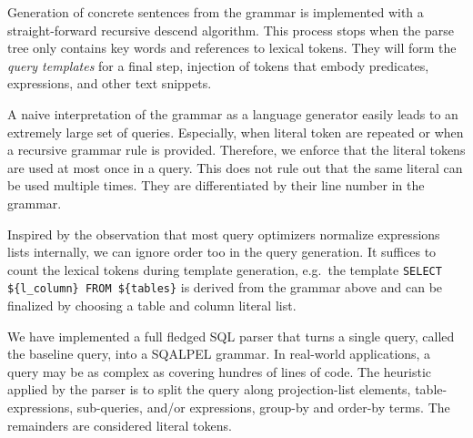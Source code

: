 \documentclass{cidr-2019}
\begin{document}
Generation of concrete sentences from the grammar is implemented with
a straight-forward recursive descend algorithm. This process stops
when the parse tree only contains key words and references to lexical
tokens. They will form the \emph{ query templates} for a final step,
injection of tokens that embody predicates, expressions, and other
text snippets.

A naive interpretation of the grammar as a language generator easily
leads to an extremely large set of queries. Especially, when literal
token are repeated or when a recursive grammar rule is provided.
Therefore, we enforce that the literal tokens are used at most once in
a query. This does not rule out that the same literal can be used
multiple times. They are differentiated by their line number in the
grammar.

Inspired by the observation that most query optimizers normalize
expressions lists internally, we can ignore order too in the query
generation. It suffices to count the lexical tokens during template
generation, e.g.\ the template \verb~SELECT ${l_column} FROM ${tables}~
is derived from the grammar above and can be finalized by choosing a
table and column literal list.




We have implemented a full fledged SQL parser that turns a single
query, called the baseline query, into a {\sc SQALPEL} grammar. In
real-world applications, a query may be as complex as covering hundres
of lines of code. The heuristic applied by the parser is to split the
query along projection-list elements, table-expressions, sub-queries,
and/or expressions, group-by and order-by terms. The remainders are
considered literal tokens.
\end{document}
